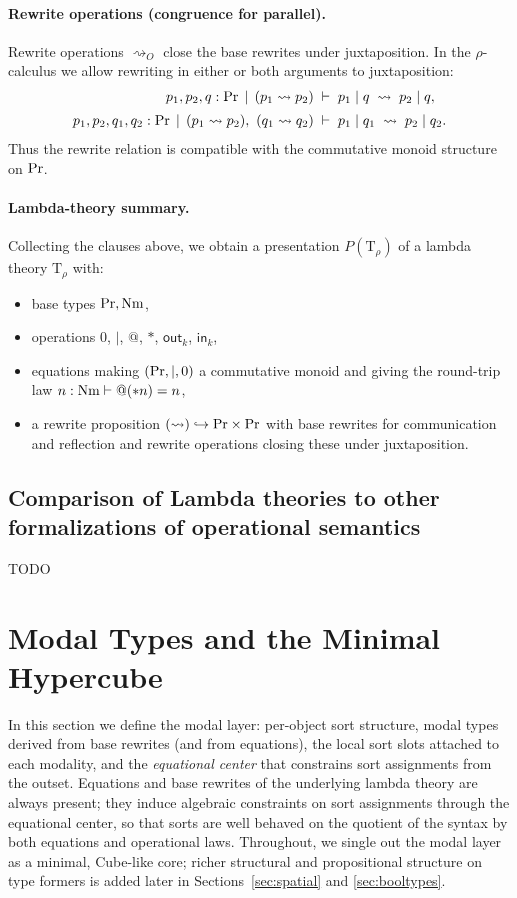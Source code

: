 \documentclass[11pt]{article}
\theoremstyle{definition}
\theoremstyle{plain}
\theoremstyle{remark}
\theoremstyle{plain}
\renewcommand{\Pr}{{\rm Pr}}
\newcommand{\Nm}{{\rm Nm}}
\newcommand{\rsq}{\rightsquigarrow}
\newcommand{\ctx}{\,|\,}
\newcommand{\mrm}[1]{\mathrm{#1}}
\newcommand{\T}{\mrm{T}}
\begin{document}
\paragraph{Rewrite operations (congruence for parallel).}
Rewrite operations $\rsq_O$ close the base rewrites under juxtaposition. In the $\rho$-calculus we allow rewriting in either or both arguments to juxtaposition:
\begin{align*}
  p_1,p_2,q:\Pr
  \;\ctx\; (p_1 \rsq p_2)
  \;&\vdash\;
  p_1 \mid q \;\rsq\; p_2 \mid q,\\[0.5ex]
  p_1,p_2,q_1,q_2:\Pr
  \;\ctx\; (p_1 \rsq p_2),\ (q_1 \rsq q_2)
  \;&\vdash\;
  p_1 \mid q_1 \;\rsq\; p_2 \mid q_2.
\end{align*}
Thus the rewrite relation is compatible with the commutative monoid structure on $\Pr$.

\paragraph{Lambda-theory summary.}
Collecting the clauses above, we obtain a presentation $P(\T_\rho)$ of a lambda theory
$\T_\rho$ with:
\begin{itemize}
  \item base types $\Pr,\Nm$,
  \item operations $0$, $\mid$, $@$, $\ast$, $\mathsf{out}_k$, $\mathsf{in}_k$,
  \item equations making $(\Pr,\mid,0)$ a commutative monoid and giving the round-trip law
        $n:\Nm\vdash @(\ast n)=n$,
  \item a rewrite proposition $(\rsq)\hookrightarrow \Pr\times\Pr$ with base rewrites for
        communication and reflection and rewrite operations closing these under juxtaposition.
\end{itemize}

\subsection{Comparison of Lambda theories to other formalizations of operational semantics}
TODO

\section{Modal Types and the Minimal Hypercube}
\label{modal}

In this section we define the modal layer: per-object sort structure, modal types derived from base rewrites (and from equations), the local sort slots attached to each modality, and the \emph{equational center} that constrains sort assignments from the outset.  Equations and base rewrites of the underlying lambda theory are always present; they induce algebraic constraints on sort assignments through the equational center, so that sorts are well behaved on the quotient of the syntax by both equations and operational laws.  Throughout, we single out the modal layer as a minimal, Cube-like core; richer structural and propositional structure on type formers is added later in Sections~\ref{sec:spatial} and \ref{sec:booltypes}.
\end{document}
